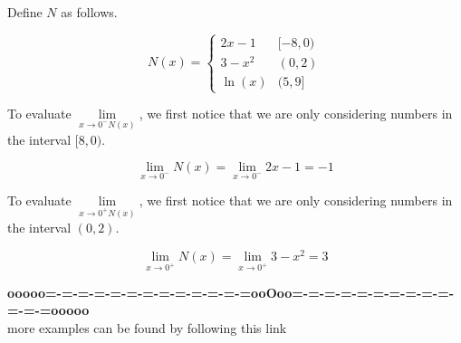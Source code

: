 \documentclass{ximera}
\begin{document}
\begin{example}

Define $N$ as follows.


\[
N(x) = 
\begin{cases}
  2x - 1   &    [-8, 0)     \\
  3 - x^2  &    (0, 2) \\
  \ln(x)    &    (5, 9]
\end{cases}
\]







\begin{explanation}


To evaluate $\lim\limits_{x \to 0^- N(x)}$, we first notice that we are only considering numbers in the interval $[8, 0)$.


\[
\lim\limits_{x \to 0^-} N(x) = \lim\limits_{x \to 0^-} 2x - 1 = -1
\]



\end{explanation}









\begin{explanation}


To evaluate $\lim\limits_{x \to 0^+ N(x)}$, we first notice that we are only considering numbers in the interval $(0,2)$.


\[
\lim\limits_{x \to 0^+} N(x) = \lim\limits_{x \to 0^+} 3 - x^2 = 3
\]



\end{explanation}





\end{example}






































\begin{center}
\textbf{\textcolor{green!50!black}{ooooo=-=-=-=-=-=-=-=-=-=-=-=-=ooOoo=-=-=-=-=-=-=-=-=-=-=-=-=ooooo}} \\

more examples can be found by following this link\\ 

\end{center}
\end{document}
